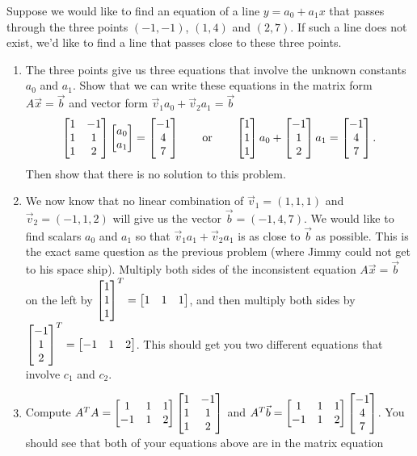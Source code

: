  
 
 



\begin{problem}
 Suppose we would like to find an equation of a line $y=a_0+a_1x$ that passes through the three points 
 $(-1,-1)$, $(1,4)$ and $(2,7)$. If such a line does not exist, we'd like to find a line that passes close to these three points. 
 \begin{enumerate}
  \item The three points give us three equations that involve the unknown constants $a_0$ and $a_1$. Show that we can write these equations in the matrix form $A\vec x = \vec b$ and vector form $\vec v_1a_0+\vec v_2a_1 = \vec b$ 
  $$\begin{bmatrix} 1&-1\\1&1\\1&2 \end{bmatrix}\begin{bmatrix} a_0\\a_1 \end{bmatrix}=\begin{bmatrix} -1\\4\\7 \end{bmatrix}\quad\quad\text{or}\quad\quad \begin{bmatrix} 1\\1\\1 \end{bmatrix}a_0+\begin{bmatrix} -1\\1\\2 \end{bmatrix}a_1=\begin{bmatrix} -1\\4\\7 \end{bmatrix}.$$
  Then show that there is no solution to this problem.
  \item We now know that no linear combination of $\vec v_1=(1,1,1)$ and $\vec v_2 =(-1,1,2)$ will give us the vector $\vec b=(-1,4,7)$.  We would like to find scalars $a_0$ and $a_1$ so that $\vec v_1a_1+\vec v_2a_1$ is as close to $\vec b$ as possible. This is the exact same question as the previous problem (where Jimmy could not get to his space ship). 
  Multiply both sides of the inconsistent equation $A\vec x = \vec b$ on the left by $\begin{bmatrix} 1\\1\\1 \end{bmatrix}^T = \begin{bmatrix} 1&1&1 \end{bmatrix}$, and then multiply both sides by  $\begin{bmatrix} -1\\1\\2 \end{bmatrix}^T = \begin{bmatrix} -1&1&2 \end{bmatrix}$. This should get you two different equations that involve $c_1$ and $c_2$. 
  \item Compute $A^TA = \begin{bmatrix} 1&1&1\\-1&1&2 \end{bmatrix}\begin{bmatrix} 1&-1\\1&1\\1&2 \end{bmatrix}$ and $A^T\vec b=\begin{bmatrix} 1&1&1\\-1&1&2 \end{bmatrix}\begin{bmatrix} -1\\4\\7 \end{bmatrix}$.  You should see that both of your equations above are in the matrix equation  

\end{enumerate}
\end{problem}
